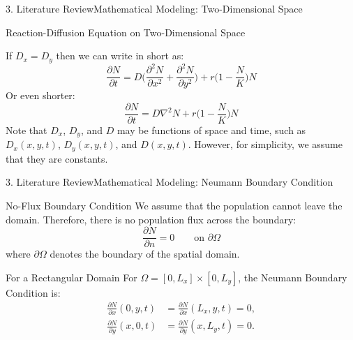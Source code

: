 \documentclass[10pt]{beamer}
\begin{document}
    \begin{frame}{3. Literature Review}{Mathematical Modeling: Two-Dimensional Space}
      \begin{center}
        \begin{block}{Reaction-Diffusion Equation on Two-Dimensional Space}
            \begin{minipage}{\textwidth}
              If $D_x = D_y$ then we can write in short as:
              $$
              \dfrac{\partial N}{\partial t} = D\Big(\dfrac{\partial^2 N}{\partial x^2} + \dfrac{\partial^2 N}{\partial y^2}\Big) + r\Big(1-\dfrac{N}{K}\Big)N
              $$
              Or even shorter:
              $$
              \dfrac{\partial N}{\partial t} = D \nabla^2 N + r\Big(1-\dfrac{N}{K}\Big)N
              $$
              Note that $D_x$, $D_y$, and $D$ may be functions of space and time, such as $D_x(x,y,t)$, $D_y(x,y,t)$, and $D(x,y,t)$. However, for simplicity, we assume that they are constants.
            \end{minipage}
        \end{block}
      \end{center}
    \end{frame}
    \begin{frame}{3. Literature Review}{Mathematical Modeling: Neumann Boundary Condition}
      \begin{block}{No-Flux Boundary Condition}
          We assume that the population cannot leave the domain. Therefore, there is no population flux across the boundary:
          $$
          \frac{\partial N}{\partial n}=0
          \qquad \text{on } \partial\Omega
          $$
          where $\partial\Omega$ denotes the boundary of the spatial domain.
      \end{block}
      \begin{block}{For a Rectangular Domain}
          For $\Omega=[0,L_x]\times[0,L_y]$, the Neumann Boundary Condition is:
          $$
          \begin{aligned}
          \frac{\partial N}{\partial x}(0,y,t)
          &=
          \frac{\partial N}{\partial x}(L_x,y,t)=0,\\[4pt]
          \frac{\partial N}{\partial y}(x,0,t)
          &=
          \frac{\partial N}{\partial y}(x,L_y,t)=0.
          \end{aligned}
          $$
      \end{block}
    \end{frame}
\end{document}
